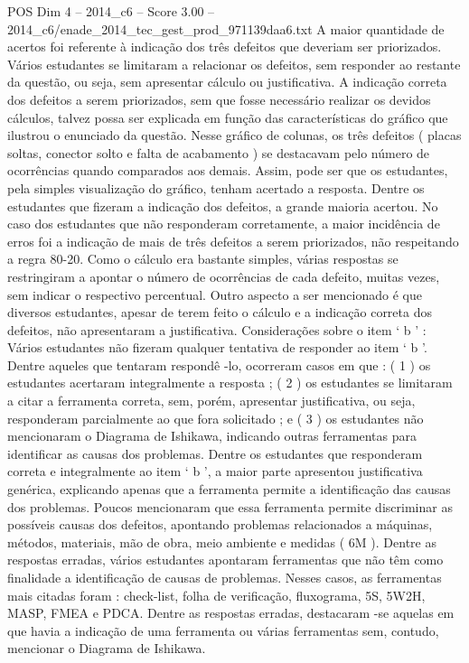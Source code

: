 \begin{textsample}{POS Dim 4 – 2014\_c6 – Score 3.00 – 2014\_c6/enade\_2014\_tec\_gest\_prod\_971139daa6.txt}
A maior quantidade de acertos foi referente à indicação dos três defeitos que deveriam ser priorizados.
Vários estudantes se limitaram a relacionar os defeitos, sem responder ao restante da questão, ou seja, sem apresentar cálculo ou justificativa.
A indicação correta dos defeitos a serem priorizados, sem que fosse necessário realizar os devidos cálculos, talvez possa ser explicada em função das características do gráfico que ilustrou o enunciado da questão.
Nesse gráfico de colunas, os três defeitos ( placas soltas, conector solto e falta de acabamento ) se destacavam pelo número de ocorrências quando comparados aos demais.
Assim, pode ser que os estudantes, pela simples visualização do gráfico, tenham acertado a resposta.
Dentre os estudantes que fizeram a indicação dos defeitos, a grande maioria acertou.
No caso dos estudantes que não responderam corretamente, a maior incidência de erros foi a indicação de mais de três defeitos a serem priorizados, não respeitando a regra 80-20.
Como o cálculo era bastante simples, várias respostas se restringiram a apontar o número de ocorrências de cada defeito, muitas vezes, sem indicar o respectivo percentual.
Outro aspecto a ser mencionado é que diversos estudantes, apesar de terem feito o cálculo e a indicação correta dos defeitos, não apresentaram a justificativa.
Considerações sobre o item ‘ b ’ : Vários estudantes não fizeram qualquer tentativa de responder ao item ‘ b ’.
Dentre aqueles que tentaram respondê -lo, ocorreram casos em que : ( 1 ) os estudantes acertaram integralmente a resposta ; ( 2 ) os estudantes se limitaram a citar a ferramenta correta, sem, porém, apresentar justificativa, ou seja, responderam parcialmente ao que fora solicitado ; e ( 3 ) os estudantes não mencionaram o Diagrama de Ishikawa, indicando outras ferramentas para identificar as causas dos problemas.
Dentre os estudantes que responderam correta e integralmente ao item ‘ b ’, a maior parte apresentou justificativa genérica, explicando apenas que a ferramenta permite a identificação das causas dos problemas.
Poucos mencionaram que essa ferramenta permite discriminar as possíveis causas dos defeitos, apontando problemas relacionados a máquinas, métodos, materiais, mão de obra, meio ambiente e medidas ( 6M ).
Dentre as respostas erradas, vários estudantes apontaram ferramentas que não têm como finalidade a identificação de causas de problemas.
Nesses casos, as ferramentas mais citadas foram : check-list, folha de verificação, fluxograma, 5S, 5W2H, MASP, FMEA e PDCA.
Dentre as respostas erradas, destacaram -se aquelas em que havia a indicação de uma ferramenta ou várias ferramentas sem, contudo, mencionar o Diagrama de Ishikawa.

\end{textsample}
